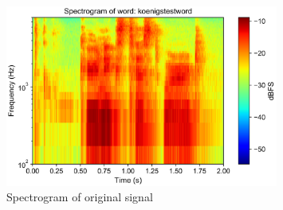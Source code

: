 \documentclass{scrartcl}
\begin{document}
\begin{figure}[h]
	\centering
	\includegraphics[width=0.8\textwidth]{figures/spectrogram_koenigstestword}
	\caption{Spectrogram of original signal}
	\label{fig:spectrogram_koenigstestword}
\end{figure}
\end{document}
